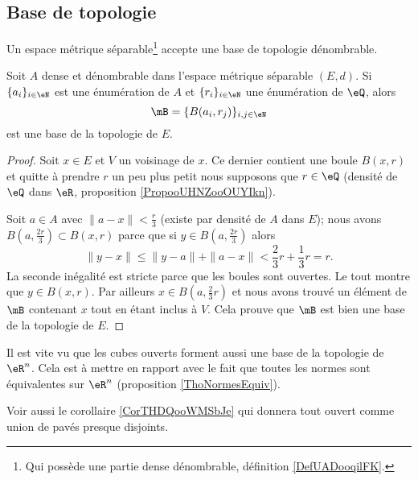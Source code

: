 \subsection{Base de topologie}

\begin{proposition} \label{PropNBSooraAFr}
    Un espace métrique séparable\footnote{Qui possède une partie dense dénombrable, définition \ref{DefUADooqilFK}.} accepte une base de topologie dénombrable.

     Soit \( A\) dense et dénombrable dans l'espace métrique séparable \( (E,d)\). Si \( \{ a_i \}_{i\in \eN}\) est une énumération de \( A\) et \( \{ r_i \}_{i\in \eN}\) une énumération de \( \eQ\), alors
    \begin{equation}
        \mB=\{ B(a_i,r_j) \}_{i,j\in \eN}
    \end{equation}
    est une base de la topologie de \( E\). 
\end{proposition}

\begin{proof}
    Soit \( x\in E\) et \( V\) un voisinage de \( x\). Ce dernier contient une boule \( B(x,r)\) et quitte à prendre \( r\) un peu plus petit nous supposons que \( r\in \eQ\) (densité de \( \eQ\) dans \( \eR\), proposition \ref{PropooUHNZooOUYIkn}).

    Soit \( a\in A\) avec \( \| a-x \|<\frac{ r }{ 3 }\) (existe par densité de \( A\) dans \( E\)); nous avons \( B(a,\frac{ 2r }{ 3 })\subset B(x,r)\) parce que si \( y\in B( a,\frac{ 2r }{ 3 } )\) alors
    \begin{equation}
        \| y-x \|\leq \| y-a \|+\| a-x \|<\frac{ 2 }{ 3 }r+\frac{ 1 }{ 3 }r=r.
    \end{equation}
    La seconde inégalité est stricte parce que les boules sont ouvertes. Le tout montre que \( y\in B(x,r)\). Par ailleurs \( x\in B(a,\frac{ 2 }{ 3 }r)\) et nous avons trouvé un élément de \( \mB\) contenant \( x\) tout en étant inclus à \( V\). Cela prouve que \( \mB\) est bien une base de la topologie de \( E\).
\end{proof}


\begin{remark}      \label{RemIPVLooHUXyeW}
    Il est vite vu que les cubes ouverts forment aussi une base de la topologie de \( \eR^n\). Cela est à mettre en rapport avec le fait que toutes les normes sont équivalentes sur \( \eR^n\) (proposition \ref{ThoNormesEquiv}).


    Voir aussi le corollaire \ref{CorTHDQooWMSbJe} qui donnera tout ouvert comme union de pavés presque disjoints.
\end{remark}

